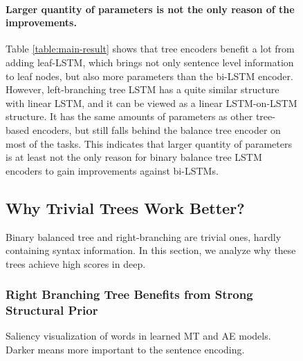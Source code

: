 \documentclass[11pt,a4paper]{article}
\begin{document}
\begin{figure}[t!]
\paragraph{Larger quantity of parameters is not the only reason of the improvements.}
Table \ref{table:main-result} shows that tree encoders benefit a lot from adding leaf-LSTM, which brings not only sentence level information to leaf nodes, but also more parameters than the bi-LSTM encoder.
However, left-branching tree LSTM has a quite similar structure with linear LSTM, and it can be viewed as a linear LSTM-on-LSTM structure. 
It has the same amounts of parameters as other tree-based encoders, but still falls behind the balance tree encoder on most of the tasks.
This indicates that larger quantity of parameters is at least not the only reason for binary balance tree LSTM encoders to gain improvements against bi-LSTMs.

 
\subsection{Why Trivial Trees Work Better?}
\label{sec:trivial}


Binary balanced tree and right-branching are trivial ones, hardly containing syntax information.
In this section, we analyze why these trees achieve high scores in deep. 


\subsubsection{Right Branching Tree Benefits from Strong Structural Prior}
\label{sec:right-better}
\begin{figure*}[t]
    \centering
    
    \caption{\label{fig:saliency} Saliency visualization of words in learned MT and AE models. Darker means more important to the sentence encoding. }
\end{figure*}


\end{figure}
\end{document}
